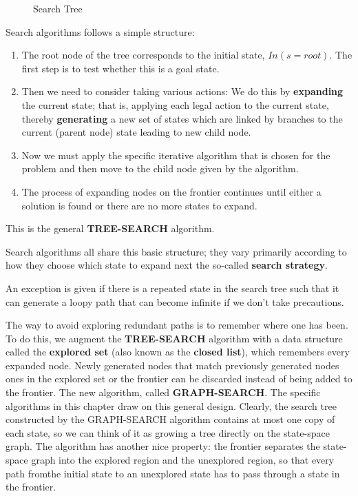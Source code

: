 \begin{figure}[h!]
\centering
{}
\caption{Search Tree}
\label{fig:Search Tree}
\end{figure}

Search algorithms follows a simple structure:
\begin{enumerate}
  \item The root node of the tree corresponds to the initial state, $In(s=root)$. The first step is to test whether this is a goal state.
  \item Then we need to consider taking various actions:
  We do this by \textbf{expanding} the current state; that is, applying each legal action to the current state, thereby \textbf{generating} a new set of states which are linked by branches to the current (parent node) state leading to new child node.
  \item Now we must apply the specific iterative algorithm that is chosen for the problem and then move to the child node given by the algorithm.
  \item The process of expanding nodes on the frontier continues until either a solution is found or there are no more states to expand.
\end{enumerate}

This is the general \textbf{TREE-SEARCH} algorithm.

Search algorithms all share this basic structure; they vary primarily according to how they choose which state to expand next the so-called \textbf{search strategy}.

An exception is given if there is a repeated state in the search tree such that it can generate a loopy path that can become infinite if we don't take precautions.

The way to avoid exploring redundant paths is to remember where one has been. To do this, we augment the \textbf{TREE-SEARCH} algorithm with a data structure called the \textbf{explored set} (also known as the \textbf{closed list}), which remembers every expanded node. Newly generated nodes that match previously generated nodes ones in the explored set or the frontier can be discarded instead of being added to the frontier. The new algorithm, called \textbf{GRAPH-SEARCH}. The specific algorithms in this chapter draw on this general design.
Clearly, the search tree constructed by the GRAPH-SEARCH algorithm contains at most one copy of each state, so we can think of it as growing a tree directly on the state-space graph. The algorithm has another nice property: the frontier separates the state-space graph into the explored region and the unexplored region, so that every path fromthe initial state to an unexplored state has to pass through a state in the frontier.
